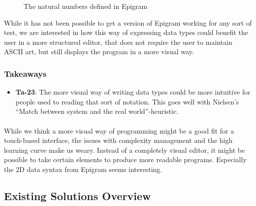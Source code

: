 \begin{figure}[htbp]
	\centering
	
	
	\caption{The natural numbers defined in Epigram}
\label{fig:epigram_data}
\end{figure}

While it has not been possible to get a version of Epigram working for any sort of test, we are interested in how this way of expressing data types could benefit the user in a more structured editor, that does not require the user to maintain ASCII art, but still displays the program in a more visual way.

\subsubsection{Takeaways}
\begin{itemize}
	\item \textbf{Ta-23}: The more visual way of writing data types could be more intuitive for people used to reading that sort of notation. This goes well with Nielsen’s ``Match between system and the real world''-heuristic.
\end{itemize}

\paragraph{}

While we think a more visual way of programming might be a good fit for a touch-based interface, the issues with complexity management and the high learning curve make us weary.
Instead of a completely visual editor, it might be possible to take certain elements to produce more readable programs. 
Especially the 2D data syntax from Epigram seems interesting.


\subsection{Existing Solutions Overview}

